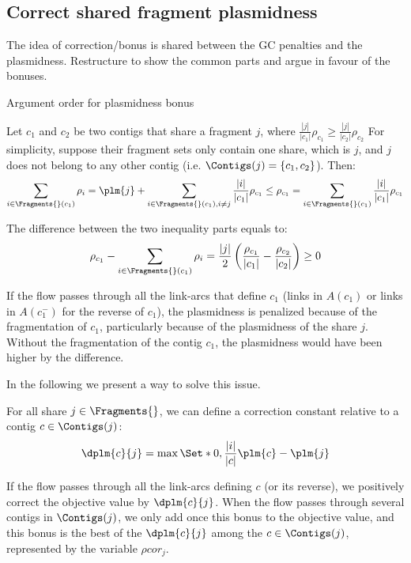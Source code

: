 \subsection{Correct shared fragment plasmidness}

\begin{refactorbox}
  The idea of correction/bonus is shared between the GC penalties and the plasmidness.
  Restructure to show the common parts and argue in favour of the bonuses.
\end{refactorbox}

\begin{fixmebox}
  Argument order for plasmidness bonus
\end{fixmebox}

Let \(c_1\) and \(c_2\) be two contigs that share a fragment \(j\), where \(\frac{ |j| }{ |c_1| } \rho_{c_1} \geq \frac{ |j| }{ |c_2| } \rho_{c_2}\)
For simplicity, suppose their fragment sets only contain one share, which is \(j\), and \(j\) does not belong to any other contig (i.e. \(\Contigs(j) = \{c_1, c_2\} \)).
Then:
\[
  \sum_{i \in \Fragments{}(c_1) } \rho_{i} = \plm{j} + \sum_{i \in \Fragments{}(c_1), i \neq j} \frac{ |i| }{ |c_1| } \rho_{c_1} \leq \rho_{c_1} = \sum_{i \in \Fragments{}(c_1) } \frac{ |i| }{ |c_1| } \rho_{c_1}
\]

The difference between the two inequality parts equals to:
\[
  \rho_{c_1} - \sum_{i \in \Fragments{}(c_1) } \rho_{i} = \frac{ |j| }{2} \left(\frac{ \rho_{c_1} }{ |c_1| } - \frac{ \rho_{c_2} }{ |c_2| } \right) \geq 0
\]

If the flow passes through all the link-arcs that define \(c_1\) (links in \(A(c_1)\) or links in \(A(c_1^-)\) for the reverse of \(c_1\)), the plasmidness is penalized because of the fragmentation of \(c_1\), particularly because of the plasmidness of the share \(j\).
Without the fragmentation of the contig \(c_1\), the plasmidness would have been higher by the difference.

In the following we present a way to solve this issue.

For all share \(j \in \Fragments{}\), we can define a correction constant relative to a contig \(c \in \Contigs(j)\):
\[
  \dplm{c}{j} = \max \Set*{0, \frac{ |i| }{ |c| }\plm{c} - \plm{j}}
\]

If the flow passes through all the link-arcs defining \(c\) (or its reverse), we positively correct the objective value by \(\dplm{c}{j}\).
When the flow passes through several contigs in \(\Contigs(j)\), we only add once this bonus to the objective value, and this bonus is the best of the \(\dplm{c}{j}\) among the \(c \in \Contigs(j)\), represented by the variable \(\rho cor_j\).

